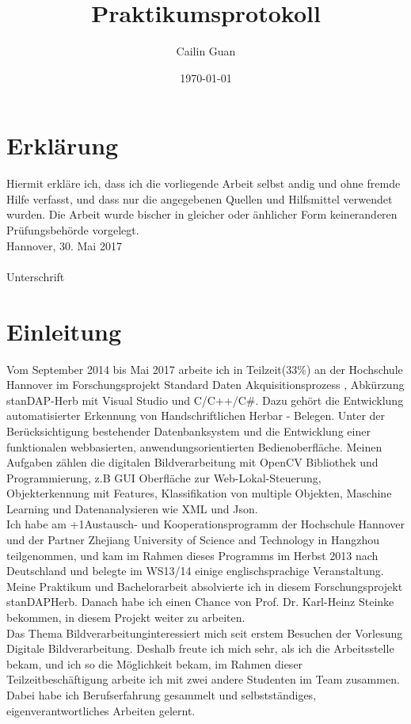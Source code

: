 \documentclass[10pt,a4paper]{report}
\title{Praktikumsprotokoll}
\author{Cailin Guan}
\date{\today}
\begin{document}
\maketitle  
\chapter*{Erklärung}

Hiermit erkläre ich, dass ich die vorliegende Arbeit selbst andig und ohne fremde Hilfe verfasst, und dass nur die angegebenen Quellen und Hilfsmittel verwendet wurden. Die Arbeit wurde bischer in gleicher oder änhlicher Form keineranderen Prüfungsbehörde vorgelegt.\\

Hannover, 30. Mai 2017\\

\underline{\hspace{4.5cm}}\\
Unterschrift
\tableofcontents  
 
\chapter{Einleitung}

Vom September 2014 bis Mai 2017 arbeite ich in Teilzeit(33\%) an der Hochschule Hannover im Forschungsprojekt \glqq Standard Daten Akquisitionsprozess \grqq, Abkürzung \glqq stanDAP-Herb \grqq mit Visual Studio und C/C++/C\#. Dazu gehört die Entwicklung automatisierter Erkennung von Handschriftlichen Herbar - Belegen. Unter der Berücksichtigung bestehender Datenbanksystem und die Entwicklung einer funktionalen webbasierten, anwendungsorientierten Bedienoberfläche. Meinen Aufgaben zählen die digitalen Bildverarbeitung mit OpenCV Bibliothek und Programmierung, z.B GUI Oberfläche zur Web-Lokal-Steuerung, Objekterkennung mit Features, Klassifikation von multiple Objekten, Maschine Learning und Datenanalysieren wie XML und Json.\\
Ich habe am +1\grqq Austausch- und Kooperationsprogramm der Hochschule Hannover und der Partner Zhejiang University of Science and Technology in Hangzhou teilgenommen, und kam im Rahmen dieses Programms im Herbst 2013 nach Deutschland und belegte im WS13/14 einige englischsprachige Veranstaltung. Meine Praktikum und Bachelorarbeit absolvierte ich in diesem Forschungsprojekt \glqq stanDAP\-Herb\grqq. Danach habe ich einen Chance von Prof. Dr. Karl-Heinz Steinke bekommen, in diesem Projekt weiter zu arbeiten.\\
Das Thema \glqq Bildverarbeitung\grqq interessiert mich seit erstem Besuchen der Vorlesung \glqq Digitale Bildverarbeitung\grqq. Deshalb freute ich mich sehr, als ich die Arbeitsstelle bekam, und ich so die Möglichkeit bekam, im Rahmen dieser Teilzeitbeschäftigung arbeite ich mit zwei andere Studenten im Team zusammen. Dabei habe ich Berufserfahrung gesammelt und selbstständiges, eigenverantwortliches Arbeiten gelernt.\\
\end{document}
